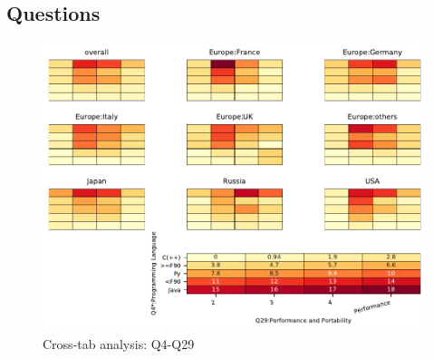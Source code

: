 
\subsection{Questions}


\begin{figure}
\begin{center}
\includegraphics[width=12cm]{../pdfs/Q4-Q29.pdf}
\caption{Cross-tab analysis: Q4-Q29}
\label{fig:Q4-Q29}
\end{center}
\end{figure}
